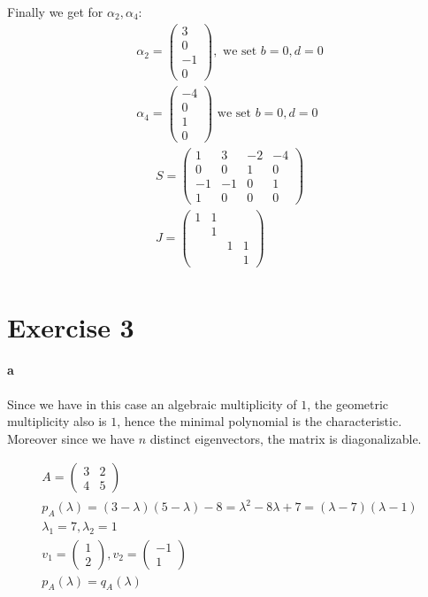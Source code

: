 Finally we get for $\alpha_2,\alpha_4$:
\begin{gather*}
\alpha_2 = \left( \begin{array}{c}
3 \\
0\\
-1\\
0
\end{array} \right),
\text{ we set } b = 0, d = 0 \\
\alpha_4 = \left( \begin{array}{c}
-4 \\
0\\
1\\
0
\end{array} \right) 
\text{ we set } b = 0, d = 0 
\end{gather*}
\begin{gather*}
S=\left( \begin{array}{cccc}
1 & 3 & -2 &-4 \\
0& 0 &1&0\\
-1& -1 & 0 & 1 \\
1& 0 & 0&0
\end{array} \right)\\
J = \left( \begin{array}{cccc}
1 & 1 & & \\
& 1 &&\\
& & 1 & 1 \\
& & &1
\end{array} \right)\\
\end{gather*}


\section{Exercise 3}
\paragraph{a}
Since we have in this case an algebraic multiplicity of $1$, the geometric multiplicity also is $1$, hence the minimal polynomial is the characteristic. Moreover since we have $n$ distinct eigenvectors, the matrix is diagonalizable.

\begin{gather*}
A = \left( \begin{array}{cc}
3&2\\
4&5
\end{array} \right)\\
p_A(\lambda) = (3-\lambda)(5-\lambda) - 8 = \lambda^2 - 8\lambda + 7 = (\lambda-7)(\lambda-1)\\
\lambda_1 = 7, \lambda_2 = 1 \\
v_1 = \left( \begin{array}{c}
1\\
2
\end{array}\right),
v_2 = \left( \begin{array}{c}
-1\\
1
\end{array} \right)\\
p_A(\lambda) = q_A(\lambda) 
\end{gather*}

